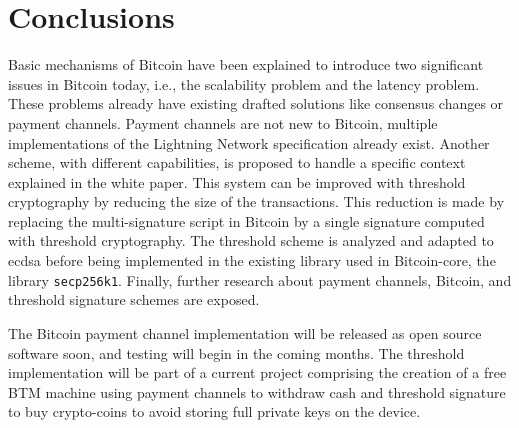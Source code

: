 \chapter{Conclusions}
\label{chap:conclusions}

Basic mechanisms of Bitcoin have been explained to introduce two significant
issues in Bitcoin today, i.e., the scalability problem and the latency problem.
These problems already have existing drafted solutions like consensus changes or
payment channels. Payment channels are not new to Bitcoin, multiple
implementations of the Lightning Network specification already exist. Another
scheme, with different capabilities, is proposed to handle a specific context
explained in the white paper. This system can be improved with threshold
cryptography by reducing the size of the transactions. This reduction is made by
replacing the multi-signature script in Bitcoin by a single signature computed
with threshold cryptography. The threshold scheme is analyzed and adapted to
\gls{ecdsa} before being implemented in the existing library used in
Bitcoin-core, the library \texttt{secp256k1}. Finally, further
research about payment channels, Bitcoin, and threshold signature schemes are
exposed.

The Bitcoin payment channel implementation will be released as open source software soon,
and testing will begin in the coming months. The threshold implementation will be
part of a current project comprising the creation of a free BTM machine using
payment channels to withdraw cash and threshold signature to buy crypto-coins to
avoid storing full private keys on the device.
